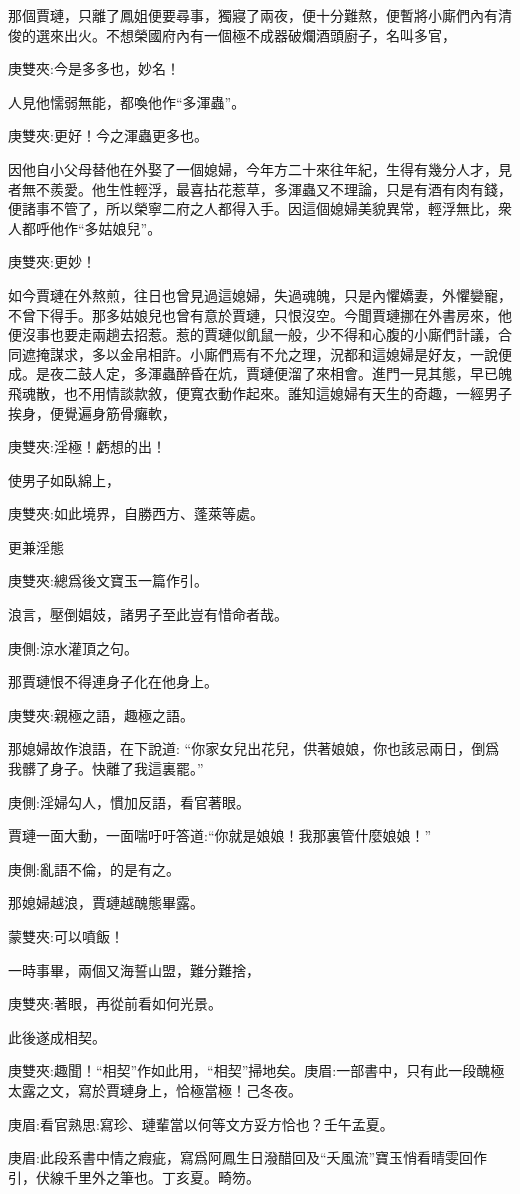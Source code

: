 \begin{parag}
    那個賈璉，只離了鳳姐便要尋事，獨寢了兩夜，便十分難熬，便暫將小廝們內有清俊的選來出火。不想榮國府內有一個極不成器破爛酒頭廚子，名叫多官，\begin{note}庚雙夾:今是多多也，妙名！\end{note}人見他懦弱無能，都喚他作“多渾蟲”。\begin{note}庚雙夾:更好！今之渾蟲更多也。\end{note}因他自小父母替他在外娶了一個媳婦，今年方二十來往年紀，生得有幾分人才，見者無不羨愛。他生性輕浮，最喜拈花惹草，多渾蟲又不理論，只是有酒有肉有錢，便諸事不管了，所以榮寧二府之人都得入手。因這個媳婦美貌異常，輕浮無比，衆人都呼他作“多姑娘兒”。\begin{note}庚雙夾:更妙！\end{note}如今賈璉在外熬煎，往日也曾見過這媳婦，失過魂魄，只是內懼嬌妻，外懼孌寵，不曾下得手。那多姑娘兒也曾有意於賈璉，只恨沒空。今聞賈璉挪在外書房來，他便沒事也要走兩趟去招惹。惹的賈璉似飢鼠一般，少不得和心腹的小廝們計議，合同遮掩謀求，多以金帛相許。小廝們焉有不允之理，況都和這媳婦是好友，一說便成。是夜二鼓人定，多渾蟲醉昏在炕，賈璉便溜了來相會。進門一見其態，早已魄飛魂散，也不用情談款敘，便寬衣動作起來。誰知這媳婦有天生的奇趣，一經男子挨身，便覺遍身筋骨癱軟，\begin{note}庚雙夾:淫極！虧想的出！\end{note}使男子如臥綿上，\begin{note}庚雙夾:如此境界，自勝西方、蓬萊等處。\end{note}更兼淫態\begin{note}庚雙夾:總爲後文寶玉一篇作引。\end{note}浪言，壓倒娼妓，諸男子至此豈有惜命者哉。\begin{note}庚側:涼水灌頂之句。\end{note}那賈璉恨不得連身子化在他身上。\begin{note}庚雙夾:親極之語，趣極之語。\end{note}那媳婦故作浪語，在下說道: “你家女兒出花兒，供著娘娘，你也該忌兩日，倒爲我髒了身子。快離了我這裏罷。”\begin{note}庚側:淫婦勾人，慣加反語，看官著眼。\end{note}賈璉一面大動，一面喘吁吁答道:“你就是娘娘！我那裏管什麼娘娘！”\begin{note}庚側:亂語不倫，的是有之。\end{note}那媳婦越浪，賈璉越醜態畢露。\begin{note}蒙雙夾:可以噴飯！\end{note}一時事畢，兩個又海誓山盟，難分難捨，\begin{note}庚雙夾:著眼，再從前看如何光景。\end{note}此後遂成相契。\begin{note}庚雙夾:趣聞！“相契”作如此用，“相契”掃地矣。庚眉:一部書中，只有此一段醜極太露之文，寫於賈璉身上，恰極當極！己冬夜。\end{note}\begin{note}庚眉:看官熟思:寫珍、璉輩當以何等文方妥方恰也？壬午孟夏。\end{note}\begin{note}庚眉:此段系書中情之瘕疵，寫爲阿鳳生日潑醋回及“夭風流”寶玉悄看晴雯回作引，伏線千里外之筆也。丁亥夏。畸笏。\end{note}

\end{parag}

